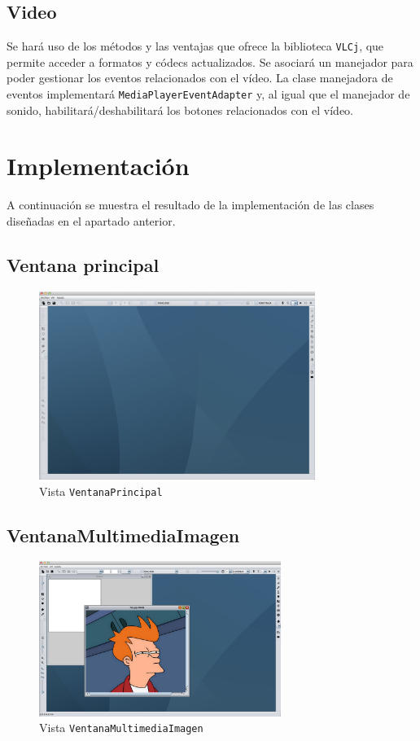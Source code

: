 \subsection{Video} 
Se hará uso de los métodos y las ventajas que ofrece la biblioteca \texttt{VLCj}, que permite acceder a formatos y códecs actualizados. Se asociará un manejador para poder gestionar los eventos relacionados con el vídeo. La clase manejadora de eventos implementará \texttt{MediaPlayerEventAdapter} y, al igual que el manejador de sonido, habilitará/deshabilitará los botones relacionados con el vídeo. 
\clearpage
\section{Implementación}
A continuación se muestra el resultado de la implementación de las clases diseñadas en el apartado anterior.
\subsection{Ventana principal}
\vskip0.3cm
\begin{figure}[H]
 \centering
  \includegraphics[width=0.8\textwidth]{graficos/ventanaPrincipal.png}
 \caption{Vista \texttt{VentanaPrincipal}}
 \label{diseño}
 \end{figure}
 
\subsection{VentanaMultimediaImagen}
\vskip0.3cm
\begin{figure}[H]
 \centering
  \includegraphics[width=0.7\textwidth]{graficos/ventanaImagen.jpg}
 \caption{Vista \texttt{VentanaMultimediaImagen}}
 \label{diseño}
 \end{figure}

